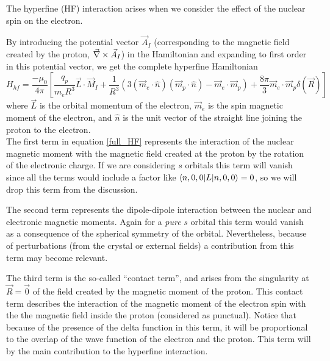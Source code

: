 The hyperfine (HF) interaction arises when we consider the effect of the nuclear spin on the electron.

By introducing the potential vector $\vec{A}_{I}$ (corresponding to the magnetic field created by the proton, $\vec{\nabla}\times\vec{A}_{I}$) in the Hamiltonian and expanding to first order in this potential vector, we get the complete hyperfine Hamiltonian
\begin{equation}
H_{hf} = \frac{-\mu_{0}}{4\pi}\left[
\frac{q_{p}}{m_{e}R^{3}}\vec{L}\cdot\vec{M}_{I} +
\frac{1}{R^{3}}\left(3(\vec{m}_{e}\cdot\hat{n})
                      (\vec{m}_{p}\cdot\hat{n})-
                      \vec{m}_{e}\cdot\vec{m}_{p}\right) +
\frac{8\pi}{3}\vec{m}_{e}\cdot\vec{m}_{p}\delta(\vec{R})
\right]
\label{full_HF}
\end{equation}
where $\vec{L}$ is the orbital momentum of the electron, $\vec{m}_{e}$ is the spin magnetic moment of the electron, and $\hat{n}$ is the unit vector of the straight line joining the proton to the electron.\\

The first term in equation \eqref{full_HF} represents the interaction of the nuclear magnetic moment with the magnetic field created at the proton by the rotation of the electronic charge. If we are considering $s$ orbitals this term will vanish since all the terms would include a factor like $\langle n,0,0|L|n,0,0\rangle = 0$, so we will drop this term from the discussion.

The second term represents the dipole-dipole interaction between the nuclear and electronic magnetic moments. Again for a \textit{pure} $s$ orbital this term would vanish as a consequence of the spherical symmetry of the orbital. Nevertheless, because of perturbations (from the crystal or external fields) a contribution from this term may become relevant. 

The third term is the so-called ``contact term'', and arises from the singularity at $\vec{R}=\vec{0}$ of the field created by the magnetic moment of the proton.
This contact term describes the interaction of the magnetic moment of the electron spin with the the magnetic field inside the proton (considered as punctual). Notice that because of the presence of the delta function in this term, it will be proportional to the overlap of the wave function of the electron and the proton. This term will by the main contribution to the hyperfine interaction.\\

